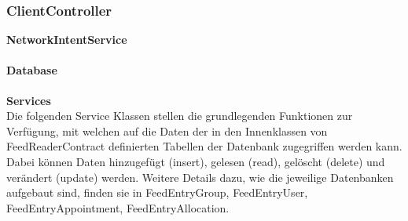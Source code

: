 \subsubsection{ClientController}

\textbf{NetworkIntentService}

\paragraph{Database}

\textbf{Services}\\
Die folgenden Service Klassen stellen die grundlegenden Funktionen zur Verfügung, mit welchen auf die Daten der in den Innenklassen von FeedReaderContract definierten Tabellen der Datenbank zugegriffen werden kann. Dabei können Daten hinzugefügt (insert), gelesen (read), gelöscht (delete) und verändert (update) werden.
Weitere Details dazu, wie die jeweilige Datenbanken aufgebaut sind, finden sie in FeedEntryGroup, FeedEntryUser, FeedEntryAppointment, FeedEntryAllocation.

